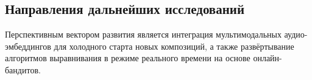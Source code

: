 \subsection{Направления дальнейших исследований}
Перспективным вектором развития является интеграция мультимодальных аудио-эмбеддингов для холодного старта новых композиций, а также развёртывание алгоритмов выравнивания в режиме реального времени на основе онлайн-бандитов.
